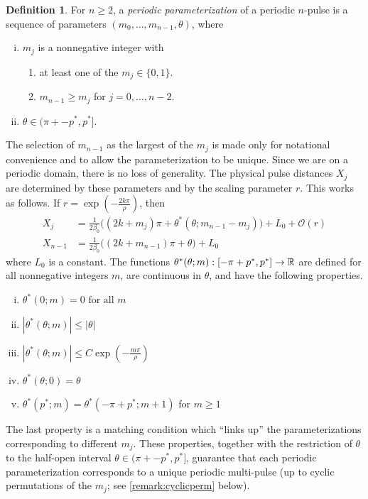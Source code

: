 \documentclass[11pt,reqno]{amsart}
\theoremstyle{plain}
\theoremstyle{definition}
\newtheorem{definition}[theorem]{Definition}
\theoremstyle{remark}
\begin{document}
\begin{definition}\label{def:perparam}
For $n \geq 2$, a \emph{periodic parameterization} of a periodic $n$-pulse is a sequence of parameters $(m_0, \dots, m_{n-1}, \theta)$, where
\begin{enumerate}[(i)]
\item $m_j$ is a nonnegative integer with
\begin{enumerate}
\item at least one of the $m_j \in \{0, 1\}$.
\item $m_{n-1} \geq m_j$ for $j = 0, \dots, n-2$.
\end{enumerate}
\item $\theta \in (\pi + -p^*, p^*]$.
\end{enumerate}
\end{definition}
The selection of $m_{n-1}$ as the largest of the $m_j$ is made only for notational convenience and to allow the parameterization to be unique. Since we are on a periodic domain, there is no loss of generality. The physical pulse distances $X_j$ are determined by these parameters and by the scaling parameter $r$. This works as follows. If $r = \exp\left(-\frac{2 k \pi}{\rho}\right)$, then
\begin{align*}
X_j &= \frac{1}{2 \beta_0}\big( (2 k + m_j)\pi + \theta^*(\theta; m_{n-1} - m_j)\big) + L_0 + \mathcal{O}(r) \\
X_{n-1} &= \frac{1}{2 \beta_0}\big( (2 k + m_{n-1})\pi + \theta \big) + L_0
\end{align*}
where $L_0$ is a constant. The functions $\theta^*(\theta; m): [-\pi + p^*, p^*] \rightarrow \mathbb{R}$ are defined for all nonnegative integers $m$, are continuous in $\theta$, and have the following properties.
\begin{enumerate}[(i)]
\item $\theta^*(0; m) = 0 \text{ for all } m$
\item $|\theta^*(\theta; m)| \leq |\theta|$
\item $|\theta^*(\theta; m)| \leq C \exp\left(-\frac{m \pi}{\rho} \right)$
\item $\theta^*(\theta; 0) = \theta $
\item $\theta^*(p^*; m) = \theta^*(-\pi+p^*; m+1)$ for $m \geq 1$
\end{enumerate}
The last property is a matching condition which ``links up'' the parameterizations corresponding to different $m_j$. These properties, together with the restriction of $\theta$ to the half-open interval $\theta \in (\pi + -p^*, p^*]$, guarantee that each periodic parameterization corresponds to a unique periodic multi-pulse (up to cyclic permutations of the $m_j$; see \cref{remark:cyclicperm} below). 
\end{document}
